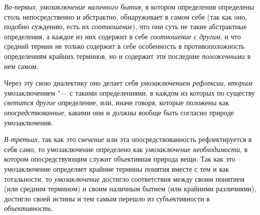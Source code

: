 {\em Во-первых},
{\em умозаключение наличного бытия},
в котором определения определены столь непосредственно и
абстрактно, обнаруживает в самом себе (так как оно, подобно суждению, есть
их {\em соотношение}),
что они суть не такие абстрактные определения, а каждое из
них содержит в себе {\em соотношение с
другим}, и что средний термин не только содержит в себе
особенность в противоположность определениям крайних терминов, но и
содержит эти последние
{\em положенными} в нем
самом.

Через эту свою диалектику оно делает себя
{\em умозаключением рефлексии},
{\em вторым}
умозаключением "--- с такими определениями, в
каждом из которых по существу
{\em светится другое}
определение, или, иначе говоря, которые положены как
{\em опосредствованные},
какими они и должны вообще быть согласно природе
умозаключения.

{\em В-третьих}, так как
это {\em свечение} или
эта опосредствованность рефлектируется в себя само, то умозаключение
определено как {\em умозаключение
необходимости}, в котором опосредствующим служит объективная
природа вещи. Так как это умозаключение определяет крайние термины понятия
вместе с тем и как тотальности, то
{\em умозаключение}
достигло соответствия между своим понятием (или средним
термином) и своим наличным бытием (или крайними различиями), достигло своей
истины и тем самым перешло из субъективности в
{\em объективность}.

